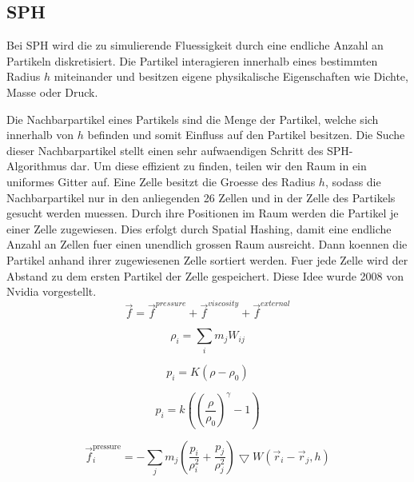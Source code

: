 \documentclass[a4paper]{paper}
\begin{document}
\subsection{SPH}

Bei SPH wird die zu simulierende Fluessigkeit durch eine endliche Anzahl an Partikeln diskretisiert. Die Partikel interagieren innerhalb eines bestimmten Radius $h$ miteinander und besitzen eigene physikalische Eigenschaften wie  Dichte, Masse oder Druck.

Die Nachbarpartikel eines Partikels sind die Menge der Partikel, welche sich innerhalb von $h$ befinden und somit Einfluss auf den Partikel besitzen. Die Suche dieser Nachbarpartikel stellt einen sehr aufwaendigen Schritt des SPH-Algorithmus dar. Um diese effizient zu finden, teilen wir den Raum in ein uniformes Gitter auf. Eine Zelle besitzt die Groesse des Radius $h$, sodass die Nachbarpartikel nur in den anliegenden 26 Zellen und in der Zelle des Partikels gesucht werden muessen. Durch ihre Positionen im Raum werden die Partikel je einer Zelle zugewiesen. Dies erfolgt durch Spatial Hashing, damit eine endliche Anzahl an Zellen fuer einen unendlich grossen Raum ausreicht. Dann koennen die Partikel anhand ihrer zugewiesenen Zelle sortiert werden. Fuer jede Zelle wird der Abstand zu dem ersten Partikel der Zelle gespeichert. Diese Idee wurde 2008 von Nvidia vorgestellt. \citep{Nvidia}
\begin{equation}
\label{force}
\vec{f} = \vec{f}^{pressure} + \vec{f}^{viscosity} + \vec{f}^{external}
\end{equation}


\begin{equation}
\label{density}
\rho_i = \sum_i{m_j W_{ij}}
\end{equation}



\begin{equation}
\label{pressure}
p_i=K(\rho-\rho_0)
\end{equation}

\begin{equation}
\label{pressure_tait}
p_i = k((\frac{\rho}{\rho_{0}})^{\gamma}-1)
\end{equation}

\begin{equation}
\label{force_pressure}
\vec{f}^{\text{pressure}}_{i} = - \sum_{j}m_{j}(\frac{p_{i}}{\rho_{i}^2} +\frac{p_{j}}{\rho_{j}^2})\bigtriangledown W(\vec{r}_{i}-\vec{r}_{j},h)
\end{equation}
\end{document}
